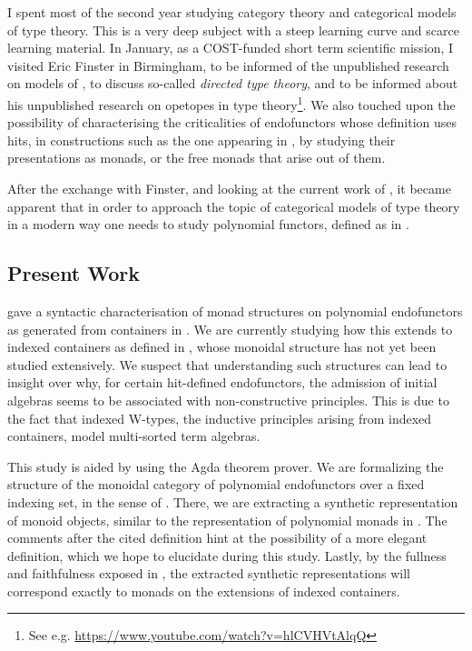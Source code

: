\documentclass[a4paper]{article}
\begin{document}
I spent most of the second year studying category theory and categorical models of type theory. This is a very deep subject with a steep learning curve and scarce learning material. In January, as a COST-funded short term scientific mission, I visited Eric Finster in Birmingham, to be informed of the unpublished research on models of , to discuss so-called \emph{directed type theory}, and to be informed about his unpublished research on opetopes in type theory\footnote{See e.g. \url{https://www.youtube.com/watch?v=hlCVHVtAlqQ}}. We also touched upon the possibility of characterising the criticalities of endofunctors whose definition uses \glspl{hit}, in constructions such as the one appearing in \cite{Joram2023}, by studying their presentations as monads, or the free monads that arise out of them.

After the exchange with Finster, and looking at the current work of \textcite{Awodey2016}, it became apparent that in order to approach the topic of categorical models of type theory in a modern way one needs to study polynomial functors, defined as in \textcite{Gambino2009}.

\subsection{Present Work}

\textcite{Uustalu2017} gave a syntactic characterisation of monad structures on polynomial endofunctors as generated from containers in \cite{Abbott2005}. We are currently studying how this extends to indexed containers as defined in \cite{Altenkirch2015}, whose monoidal structure has not yet been studied extensively. We suspect that understanding such structures can lead to insight over why, for certain \gls{hit}-defined endofunctors, the admission of initial algebras seems to be associated with non-constructive principles. This is due to the fact that indexed W-types, the inductive principles arising from indexed containers, model multi-sorted term algebras.

This study is aided by using the Agda theorem prover. We are formalizing the structure of the monoidal category of polynomial endofunctors over a fixed indexing set, in the sense of \cite{Altenkirch2015}. There, we are extracting a synthetic representation of monoid objects, similar to the representation of polynomial monads in \cite[Section 3, definition of \emph{mnd-container}]{Uustalu2017}. The comments after the cited definition hint at the possibility of a more elegant definition, which we hope to elucidate during this study. Lastly, by the fullness and faithfulness exposed in \cite[Proposition 4.1]{Altenkirch2015}, the extracted synthetic representations will correspond exactly to monads on the extensions of indexed containers.
\end{document}
